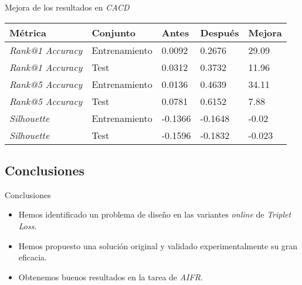 \begin{frame}{Mejora de los resultados en \textit{CACD}}

	\begin{table}
		\centering
		\begin{tabular}{|l|l|l|l|l|}
			\hline
			Métrica                  & Conjunto      & Antes   & Después & Mejora \\
			\hline
			\textit{Rank@1 Accuracy} & Entrenamiento & 0.0092  & 0.2676  & 29.09  \\
			\textit{Rank@1 Accuracy} & Test          & 0.0312  & 0.3732  & 11.96  \\
			\textit{Rank@5 Accuracy} & Entrenamiento & 0.0136  & 0.4639  & 34.11  \\
			\textit{Rank@5 Accuracy} & Test          & 0.0781  & 0.6152  & 7.88   \\
			\textit{Silhouette}      & Entrenamiento & -0.1366 & -0.1648 & -0.02  \\
			\textit{Silhouette}      & Test          & -0.1596 & -0.1832 & -0.023 \\
			\hline
		\end{tabular}
		\label{table:comparaciones_cacd_resultados}
	\end{table}


\end{frame}

\subsection{Conclusiones}
\begin{frame}{Conclusiones}

	\begin{itemize}
		\item Hemos identificado un problema de diseño en las variantes \textit{online} de \textit{Triplet Loss}.
		\item Hemos propuesto una solución original y validado experimentalmente su gran eficacia.
		\item Obtenemos buenos resultados en la tarea de \textit{AIFR}.
	\end{itemize}

\end{frame}
